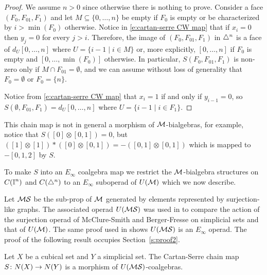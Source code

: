 \begin{proof}
	We assume $n > 0$ since otherwise there is nothing to prove.
	Consider a face $(F_0, F_{01}, F_1)$ and let $M \subseteq \{0, \dots, n\}$ be empty if $F_0$ is empty or be characterized by $i > \min (F_0)$ otherwise.
	Notice in \eqref{e:cartan-serre CW map} that if $x_i = 0$ then $y_j = 0$ for every $j > i$.
	Therefore, the image of $(F_0, F_{01}, F_1)$ in $\triangle^n$ is a face of $d_U[0, \dots, n]$ where $U = \{i-1 \mid i \in M\}$ or, more explicitly, $[0, \dots, n]$ if $F_0$ is empty and $[0, \dots, \min(F_0)]$ otherwise.
	In particular, $S(F_0, F_{01}, F_1)$ is non-zero only if $M \cap F_{01} = \emptyset$, and we can assume without loss of generality that $F_0 = \emptyset$ or $F_0 = \{n\}$.

	Notice from \eqref{e:cartan-serre CW map} that $x_i = 1$ if and only if $y_{i-1} = 0$, so $S(\emptyset, F_{01}, F_1) = d_{U} [0, \dots, n]$ where $U = \{i-1 \mid i \in F_1\}$.
\end{proof}


This chain map is not in general a morphism of $\mathcal{M}$-bialgebras, for example, notice that $S([0] \otimes [0,1]) = 0$, but $([1] \otimes [1]) \ast ([0] \otimes [0,1]) = -([0,1] \otimes [0,1])$ which is mapped to $-[0,1,2]$ by $S$.

To make $S$ into an $E_\infty$ coalgebra map we restrict the $\mathcal{M}$-bialgebra structures on $C(\bm{\mathbb{I}}^n)$ and $C(\triangle^n)$ to an $E_\infty$ suboperad of $U(\mathcal{M})$ which we now describe.



Let $\mathcal{MS}$ be the sub-prop of $\mathcal{M}$ generated by elements represented by surjection-like graphs.
The associated operad $U(\mathcal{MS})$ was used in \cite[Theorem A.11.]{Medina20prop1} to compare the action of the surjection operad of McClure-Smith \cite{McClure} and Berger-Fresse \cite{Berger} on simplicial sets and that of $U(\mathcal{M})$.
The same proof used in \cite[Theorem 3.3.]{Medina20prop1} shows $U(\mathcal{MS})$ is an $E_\infty$ operad.
The proof of the following result occupies Section~\ref{s:proof2}.
 
\begin{theorem} \label{t:comparison}
	Let $X$ be a cubical set and $Y$ a simplicial set.
	The Cartan-Serre chain map $S \colon N(X) \to N(Y)$ is a morphism of $U(\mathcal{MS})$-coalgebras.
\end{theorem}